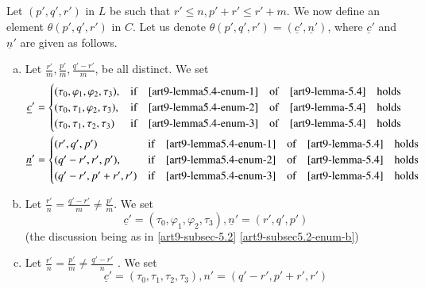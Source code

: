 \subsection{}\label{art9-subsec-5.5}
Let $(p',q',r')$ in $L$ be such that $ r' \leq n, p' +r' \leq r' +m$. We now define an element $\theta(p',q',r')$ in $C$. Let us denote $\theta(p',q',r') = (\underline{c}', \underline{n}')$, where $\underline{c}'$ and $\underline{n}'$ are given as follows.
\begin{enumerate}[(a)]
\item Let $\frac{r'}{m}, \frac{p'}{m}, \frac{q'-r'}{m}$, be all distinct. We set\label{art9-subsec5.5-enum-a}
\begin{align*}
\underline{c}'&=
\begin{cases}
(\tau_{0}, \varphi_{1}, \varphi_{2}, \tau_{3}),& \text{if}\quad \eqref{art9-lemma5.4-enum-1}\quad \text{of}\quad \ref{art9-lemma-5.4}\quad \text{holds}\\
(\tau_{0}, \tau_{1}, \varphi_{2}, \tau_{3}), & \text{if}\quad \eqref{art9-lemma5.4-enum-2}\quad \text{of}\quad \ref{art9-lemma-5.4}\quad \text{holds}\\
(\tau_{0}, \tau_{1}, \tau_{2}, \tau_{3}) & \text{if}\quad \eqref{art9-lemma5.4-enum-3}\quad \text{of}\quad \ref{art9-lemma-5.4}\quad \text{holds}
\end{cases}\\
\underline{n}' &=
\begin{cases}
(r', q',p')  & \text{if}\quad \eqref{art9-lemma5.4-enum-1}\quad \text{of}\quad \ref{art9-lemma-5.4}\quad \text{holds}\\
(q'-r',r',p'), & \text{if}\quad \eqref{art9-lemma5.4-enum-2}\quad \text{of}\quad \ref{art9-lemma-5.4}\quad \text{holds}\\
(q'-r', p'+r',r')& \text{if}\quad \eqref{art9-lemma5.4-enum-3}\quad \text{of}\quad \ref{art9-lemma-5.4}\quad \text{holds}
\end{cases}
\end{align*}

\item Let $\frac{r'}{n} = \frac{q'-r'}{m}\neq \frac{p'}{m}$. We set\label{art9-subsec5.5-enum-b}
$$
\underline{c}' = (\tau_{0}, \varphi_{1}, \varphi_{2}, \tau_{3}), \underline{n}'= (r',q', p')
$$
(the discussion being as in \ref{art9-subsec-5.2} \eqref{art9-subsec5.2-enum-b})

\item Let $\frac{r'}{n} = \frac{p'}{m} \neq \frac{q'-r'}{n}$ . We set\label{art9-subsec5.5-enum-c}
$$
\underline{c}' = (\tau_{0}, \tau_{1}, \tau_{2}, \tau_{3}), n' = (q'-r',p'+r', r')
$$


\end{enumerate}
